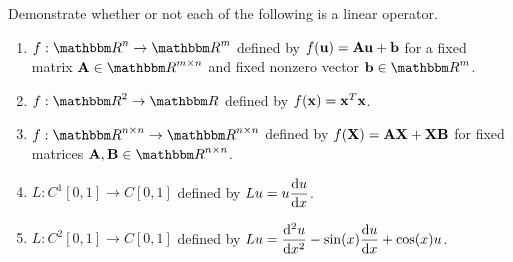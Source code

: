 Demonstrate whether or not each of the following is a linear operator.

\begin{enumerate}
\item $f:\R^n\to \R^m$ defined by $f({\bf u}) = {\bf A} {\bf u} + {\bf b}$ for a fixed matrix $\BA\in\Rmn$ and fixed nonzero vector $\Bb\in\Rm$.
\\
\item $f:\R^2 \to \R$ defined by $f({\bf x}) = {\bf x}^T {\bf x}$.
\\
\item $f:\Rnn\to \Rnn$ defined by $f({\bf X}) = {\bf A}{\bf X} + {\bf X}{\bf B}$ for fixed matrices $\BA, \BB\in\Rnn$.
\\
\item $L: C^1[0,1] \to C[0,1]$ defined by ${\displaystyle{ Lu = u {{\rm d}u \over {\rm d}x}}}$.
\\
\item $L: C^2[0,1] \to C[0,1]$ defined by ${\displaystyle{ Lu = {{\rm d}^2 u \over {\rm d}x^2} - \sin(x) {{\rm d}u \over {\rm d}x} + \cos(x) u}}$.

\end{enumerate}



